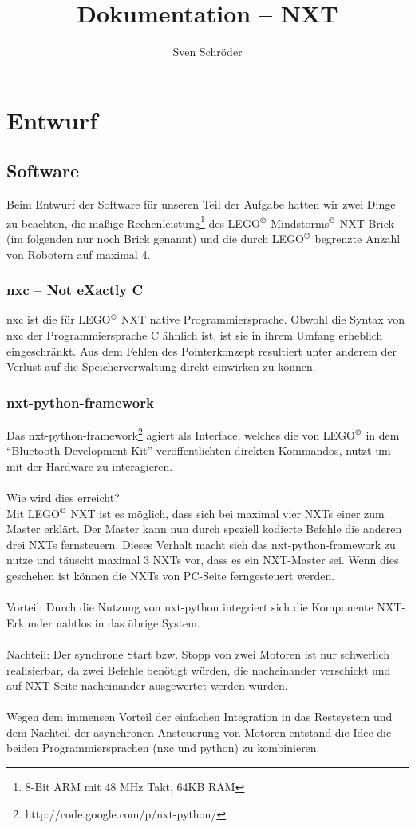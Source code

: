 \documentclass[10pt,a4paper]{scrartcl}
\author{Sven Schröder}
\title{Dokumentation -- NXT}
\begin{document}
\maketitle
\tableofcontents
\section{Entwurf}
\subsection{Software}
Beim Entwurf der Software für unseren Teil der Aufgabe hatten wir zwei Dinge zu beachten, die mäßige Rechenleistung\footnote{8-Bit ARM mit 48 MHz Takt, 64KB RAM} des LEGO$^\copyright$ Mindstorms$^\copyright$ NXT Brick (im folgenden nur noch Brick genannt) und die durch LEGO$^\copyright$ begrenzte Anzahl von Robotern auf maximal 4. 
\subsubsection{nxc -- Not eXactly C}
nxc ist die für LEGO$^\copyright$ NXT native Programmiersprache. Obwohl die Syntax von nxc der Programmiersprache C ähnlich ist, ist sie in ihrem Umfang erheblich eingeschränkt. Aus dem Fehlen des Pointerkonzept resultiert unter anderem der Verlust auf die Speicherverwaltung direkt einwirken zu können.
\subsubsection{nxt-python-framework}
Das nxt-python-framework\footnote{http://code.google.com/p/nxt-python/} agiert als Interface, welches die von LEGO$^\copyright$ in dem "`Bluetooth Development Kit"' veröffentlichten direkten Kommandos, nutzt um mit der Hardware zu interagieren.\\
\\
Wie wird dies erreicht?\\
Mit LEGO$^\copyright$ NXT ist es möglich, dass sich bei maximal vier NXTs einer zum Master erklärt. Der Master kann nun durch speziell kodierte Befehle die anderen drei NXTs fernsteuern. Dieses Verhalt macht sich das nxt-python-framework zu nutze und täuscht maximal 3 NXTs vor, dass es ein NXT-Master sei. Wenn dies geschehen ist können die NXTs von PC-Seite ferngesteuert werden.\\
\\
Vorteil: Durch die Nutzung von nxt-python integriert sich die Komponente NXT-Erkunder nahtlos in das übrige System.\\
\\
Nachteil: Der synchrone Start bzw. Stopp von zwei Motoren ist nur schwerlich realisierbar, da zwei Befehle benötigt würden, die nacheinander verschickt und auf NXT-Seite nacheinander ausgewertet werden würden. \\
\\
Wegen dem immensen Vorteil der einfachen Integration in das Restsystem und dem Nachteil der asynchronen Ansteuerung von Motoren entstand die Idee die beiden Programmiersprachen (nxc und python) zu kombinieren.
\end{document}
